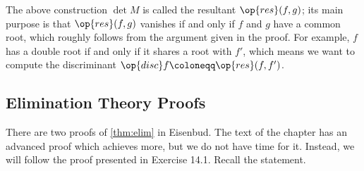 \begin{remark}
	The above construction $\det M$ is called the resultant $\op{res}(f,g)$; its main purpose is that $\op{res}(f,g)$ vanishes if and only if $f$ and $g$ have a common root, which roughly follows from the argument given in the proof. For example, $f$ has a double root if and only if it shares a root with $f'$, which means we want to compute the discriminant $\op{disc}f\coloneqq\op{res}(f,f')$.
\end{remark}

\subsection{Elimination Theory Proofs}
There are two proofs of \autoref{thm:elim} in Eisenbud. The text of the chapter has an advanced proof which achieves more, but we do not have time for it. Instead, we will follow the proof presented in Exercise 14.1. Recall the statement.
\elimthm*
